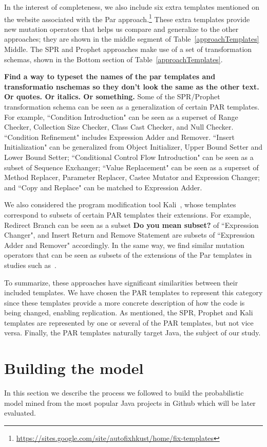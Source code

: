\documentclass[conference]{IEEEtran}
\newcommand{\todo}[1]
  {{\scriptsize \textbf{\color{red} {#1}}}}
\begin{document}
In the interest of completeness, we also include six extra templates 
mentioned on the website associated with the Par
approach.\footnote{\url{https://sites.google.com/site/autofixhkust/home/fix-templates}} 
These extra templates provide new mutation operators that helps us compare and
generalize to the other approaches; they are shown in the middle segment of
Table~\ref{approachTemplates} Middle. 
The SPR and Prophet approaches make use of a set of transformation schemas,
shown in the Bottom section of Table~\ref{approachTemplates}.

\todo{Find a way to typeset the names of the par templates and transformatio
  nschemas so they don't look the same as the other text.  Or quotes.  Or
  italics.  Or something.}
Some of the SPR/Prophet transformation schema can be seen as a generalization of certain PAR 
templates. For example, ``Condition Introduction" can be seen as a superset of 
Range Checker, Collection Size 
Checker, Class Cast Checker, and Null Checker. ``Condition Refinement" includes
Expression Adder and Remover. ``Insert Initialization" can be 
generalized from Object Initializer, Upper Bound Setter and Lower Bound Setter; ``Conditional Control Flow Introduction" can be 
seen as a subset of Sequence Exchanger;
``Value Replacement" can be seen as a superset of Method 
Replacer, Parameter Replacer, Castee Mutator and Expression Changer; and ``Copy 
and Replace" can be matched to Expression Adder. 

We also considered the program modification tool Kali~\cite{Qi15}, whose
templates correspond to subsets of certain PAR templates their extensions. 
For example, Redirect Branch can be seen as
a subset \todo{Do you mean subset?}  of ``Expression Changer", and Insert Return and Remove Statement are
subsets of ``Expression Adder and Remover" accordingly. In the same way, we find
similar mutation operators that can be seen as subsets of the extensions of the
Par templates in studies such as~\cite{Offutt96,Offutt06}. 

To summarize, these approaches have significant similarities between their
included templates.  We have chosen the PAR templates to represent this category 
since these templates provide a more concrete description of how the code is 
being changed, enabling replication. As mentioned, 
the SPR, Prophet and Kali templates are represented by one or several of the PAR
templates, but not vice versa.  Finally, the PAR templates naturally target
Java, the subject of our study. 


\section{Building the model} \label{buildingTheModel}
In this section we describe the process we followed to build the probabilistic model mined from the most popular Java projects in Github which will be later evaluated.
\end{document}
